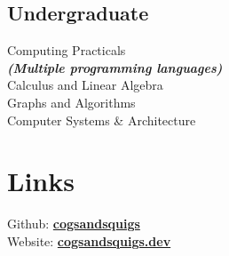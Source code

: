 \documentclass[]{deedy-resume-reversed}
\begin{document}
\begin{minipage}[t]{0.33\textwidth}
	\subsection{Undergraduate}
	Computing Practicals \\
	{\footnotesize \textit{\textbf{(Multiple programming languages) }}} \\
	Calculus and Linear Algebra \\
	Graphs and Algorithms \\
	Computer Systems \& Architecture
	\sectionsep




	\section{Links}
	Github: \href{https://github.com/cogsandsquigs}{\bf cogsandsquigs} \\
	Website: \href{https://cogsandsquigs.dev}{\bf cogsandsquigs.dev}
	\sectionsep

\end{minipage}
\end{document}
